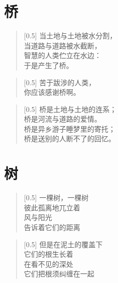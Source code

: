 \documentclass[12pt,UTF-8,openany]{ctexbook}
\begin{document}
\chapter{桥}

\begin{large}
    
    \begin{verse}[0.5\linewidth]
        当土地与土地被水分割， \\
        当道路与道路被水截断， \\
        智慧的人类伫立在水边： \\
        于是产生了桥。
    \end{verse}
    
    
    \begin{verse}[0.5\linewidth]
        苦于跋涉的人类， \\
        你应该感谢桥啊。
    \end{verse}
    
    
    \begin{verse}[0.5\linewidth]
        桥是土地与土地的连系； \\
        桥是河流与道路的爱情。 \\
        桥是异乡游子睡梦里的寄托； \\
        桥是送别的人断不了的回忆。
    \end{verse}
    
\end{large}



\chapter{树}

\begin{large}
    
    \begin{verse}[0.5\linewidth]
        一棵树，一棵树 \\
        彼此孤离地兀立着 \\
        风与阳光 \\
        告诉着它们的距离
    \end{verse}
    
    
    \begin{verse}[0.5\linewidth]
        但是在泥土的覆盖下 \\
        它们的根生长着 \\
        在看不见的深处 \\
        它们把根须纠缠在一起
    \end{verse}
    
\end{large}
\end{document}

